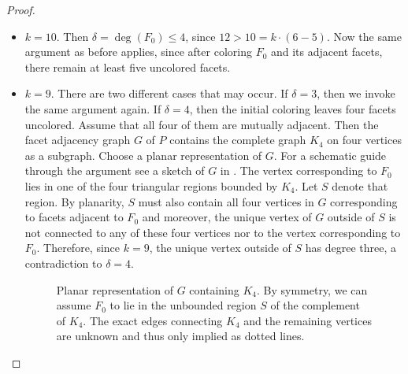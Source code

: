 \documentclass[a4paper,10pt]{amsart}
\theoremstyle{definition}
\theoremstyle{plain}
\begin{document}
\begin{proof}
\begin{itemize}
     \item $k = 10$. Then $\delta = \deg(F_0) \leq 4$, since $12 > 10 = k \cdot (6-5)$. Now the same argument as before applies, since after coloring $F_0$ and its adjacent facets, there remain at least five uncolored facets.

     \item $k = 9$. There are two different cases that may occur. If $\delta = 3$, then we invoke the same argument again. If $\delta = 4$, then the initial coloring leaves four facets uncolored. Assume that all four of them are mutually adjacent. Then the facet adjacency graph $G$ of $P$ contains the complete graph $K_4$ on four vertices as a subgraph. Choose a planar representation of $G$. For a schematic guide through the argument see a sketch of $G$ in . The vertex corresponding to $F_0$ lies in one of the four triangular regions bounded by $K_4$. Let $S$ denote that region. By planarity, $S$ must also contain all four vertices in $G$ corresponding to facets adjacent to $F_0$ and moreover, the unique vertex of $G$ outside of $S$ is not connected to any of these four vertices nor to the vertex corresponding to $F_0$. Therefore, since $k = 9$, the unique vertex outside of $S$ has degree three, a contradiction to $\delta = 4$. \qedhere

     \begin{figure}[h]
         \centering
{}
         \caption{Planar representation of $G$ containing $K_4$. By symmetry, we can assume $F_0$ to lie in the unbounded region $S$ of the complement of $K_4$. The exact edges connecting $K_4$ and the remaining vertices are unknown and thus only implied as dotted lines.}
         \label{fig:subK4}
     \end{figure}
 \end{itemize}
\end{proof}
\end{document}
